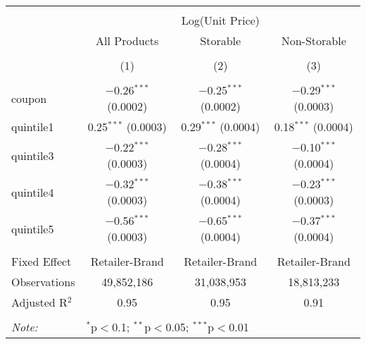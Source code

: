 
\begin{table}[!htbp] \centering 
  \caption{} 
  \label{tab:overallSavings} 
\begin{tabular}{@{\extracolsep{5pt}}lccc} 
\\[-1.8ex]\hline 
\hline \\[-1.8ex] 
 & \multicolumn{3}{c}{Log(Unit Price)} \\ 
\cline{2-4} 
 & All Products & Storable & Non-Storable \\ 
\\[-1.8ex] & (1) & (2) & (3)\\ 
\hline \\[-1.8ex] 
 coupon & $-$0.26$^{***}$ (0.0002) & $-$0.25$^{***}$ (0.0002) & $-$0.29$^{***}$ (0.0003) \\ 
  quintile1 & 0.25$^{***}$ (0.0003) & 0.29$^{***}$ (0.0004) & 0.18$^{***}$ (0.0004) \\ 
  quintile3 & $-$0.22$^{***}$ (0.0003) & $-$0.28$^{***}$ (0.0004) & $-$0.10$^{***}$ (0.0004) \\ 
  quintile4 & $-$0.32$^{***}$ (0.0003) & $-$0.38$^{***}$ (0.0004) & $-$0.23$^{***}$ (0.0003) \\ 
  quintile5 & $-$0.56$^{***}$ (0.0003) & $-$0.65$^{***}$ (0.0004) & $-$0.37$^{***}$ (0.0004) \\ 
 \hline \\[-1.8ex] 
Fixed Effect & Retailer-Brand & Retailer-Brand & Retailer-Brand \\ 
Observations & 49,852,186 & 31,038,953 & 18,813,233 \\ 
Adjusted R$^{2}$ & 0.95 & 0.95 & 0.91 \\ 
\hline 
\hline \\[-1.8ex] 
\textit{Note:}  & \multicolumn{3}{l}{$^{*}$p$<$0.1; $^{**}$p$<$0.05; $^{***}$p$<$0.01} \\ 
\end{tabular} 
\end{table} 
